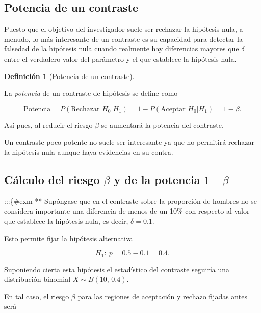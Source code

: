 \documentclass[
  a4paper,
]{scrreport}
\theoremstyle{plain}
\theoremstyle{definition}
\theoremstyle{definition}
\newtheorem{definition}{Definición}[chapter]
\theoremstyle{remark}
\begin{document}
\subsection{Potencia de un contraste}\label{potencia-de-un-contraste}

Puesto que el objetivo del investigador suele ser rechazar la hipótesis
nula, a menudo, lo más interesante de un contraste es su capacidad para
detectar la falsedad de la hipótesis nula cuando realmente hay
diferencias mayores que \(\delta\) entre el verdadero valor del
parámetro y el que establece la hipótesis nula.

\begin{definition}[Potencia de un
contraste]\protect\hypertarget{def-potencia-contraste}{}\label{def-potencia-contraste}

La \emph{potencia} de un contraste de hipótesis se define como

\[
\mbox{Potencia} = P(\mbox{Rechazar }H_0|H_1) = 1 - P(\mbox{Aceptar }H_0|H_1) = 1-\beta.
\]

\end{definition}

Así pues, al reducir el riesgo \(\beta\) se aumentará la potencia del
contraste.

Un contraste poco potente no suele ser interesante ya que no permitirá
rechazar la hipótesis nula aunque haya evidencias en su contra.

\subsection{\texorpdfstring{Cálculo del riesgo \(\beta\) y de la
potencia
\(1-\beta\)}{Cálculo del riesgo \textbackslash beta y de la potencia 1-\textbackslash beta}}\label{cuxe1lculo-del-riesgo-beta-y-de-la-potencia-1-beta}

:::\{\#exm-** Supóngase que en el contraste sobre la proporción de
hombres no se considera importante una diferencia de menos de un 10\%
con respecto al valor que establece la hipótesis nula, es decir,
\(\delta=0.1\).

Esto permite fijar la hipótesis alternativa

\[H_1:\ p=0.5-0.1=0.4.\]

Suponiendo cierta esta hipótesis el estadístico del contraste seguiría
una distribución binomial \(X\sim B(10,\,0.4)\).

En tal caso, el riesgo \(\beta\) para las regiones de aceptación y
rechazo fijadas antes será
\end{document}
